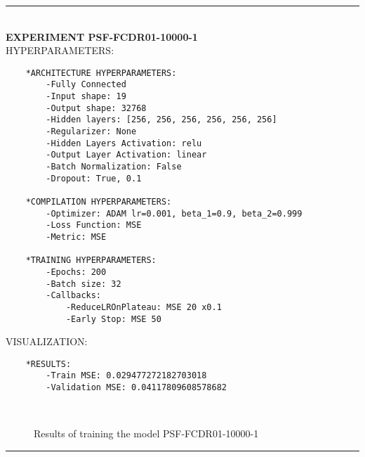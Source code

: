 \rule{0.5\textwidth}{0.5pt}\\

	{\large \textbf{EXPERIMENT PSF-FCDR01-10000-1}}\\
	
	{\normalsize HYPERPARAMETERS:}
	\begin{lstlisting}	
	*ARCHITECTURE HYPERPARAMETERS:
		-Fully Connected
		-Input shape: 19
		-Output shape: 32768
		-Hidden layers: [256, 256, 256, 256, 256, 256]
		-Regularizer: None
		-Hidden Layers Activation: relu
		-Output Layer Activation: linear
		-Batch Normalization: False
		-Dropout: True, 0.1
	
	*COMPILATION HYPERPARAMETERS:
		-Optimizer: ADAM lr=0.001, beta_1=0.9, beta_2=0.999
		-Loss Function: MSE
		-Metric: MSE
	
	*TRAINING HYPERPARAMETERS:
		-Epochs: 200
		-Batch size: 32
		-Callbacks: 
			-ReduceLROnPlateau: MSE 20 x0.1
			-Early Stop: MSE 50
	\end{lstlisting}
	
	{\normalsize VISUALIZATION:}
	\begin{lstlisting}
	*RESULTS:
        -Train MSE: 0.029477272182703018
        -Validation MSE: 0.04117809608578682
	\end{lstlisting}
	
	\begin{figure*}[ht!]
		\hspace{\fill}
		\hspace{\fill}
		\\
		\caption{Results of training the model PSF-FCDR01-10000-1}
	\end{figure*}
	
\FloatBarrier	
\rule{0.5\textwidth}{0.5pt}\\